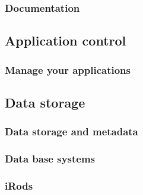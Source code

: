 \documentclass[14pt]{beamer}
\begin{document}
\begin{frame}
\frametitle{Documentation}
\end{frame}

\subsection{Application control}
\begin{frame}
\frametitle{Manage your applications}
\end{frame}

\subsection{Data storage}
\begin{frame}
\frametitle{Data storage and metadata}
\end{frame}

\begin{frame}
\frametitle{Data base systems}
\end{frame}

\begin{frame}
\frametitle{iRods}
\end{frame}
\end{document}
